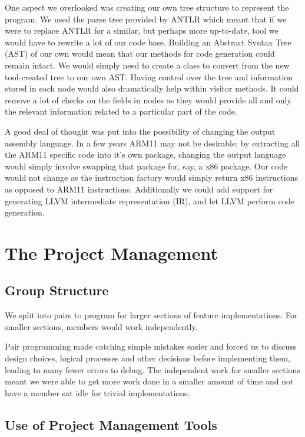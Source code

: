 \documentclass[11pt,a4paper]{article}
\begin{document}
One aspect we overlooked was creating our own tree structure to represent the program. We used the parse tree provided by ANTLR which meant that if we were to replace ANTLR for a similar, but perhaps more up-to-date, tool we would have to rewrite a lot of our code base. Building an Abstract Syntax Tree (AST) of our own would mean that our methods for code generation could remain intact. We would simply need to create a class to convert from the new tool-created tree to our own AST. Having control over the tree and information stored in each node would also dramatically help within visitor methods. It could remove a lot of checks on the fields in nodes as they would provide all and only the relevant information related to a particular part of the code. 

A good deal of thought was put into the possibility of changing the output assembly language. In a few years ARM11 may not be desirable; by extracting all the ARM11 specific code into it's own package, changing the output language would simply involve swapping that package for, say, a x86 package. Our code would not change as the instruction factory would simply return x86 instructions as opposed to ARM11 instructions. Additionally we could add support for generating LLVM intermediate representation (IR), and let LLVM perform code generation.

\section{The Project Management}
\label{sec:The Project Management}

\subsection{Group Structure}
\label{sub:Group Structure}

We split into pairs to program for larger sections of feature implementations. For smaller sections, members would work independently.

Pair programming made catching simple mistakes easier and forced us to discuss design choices, logical processes and other decisions before implementing them, leading to many fewer errors to debug. The independent work for smaller sections meant we were able to get more work done in a smaller amount of time and not have a member sat idle for trivial implementations.

\subsection{Use of Project Management Tools}
\label{sub:Use of Project Management Tools}
\end{document}
